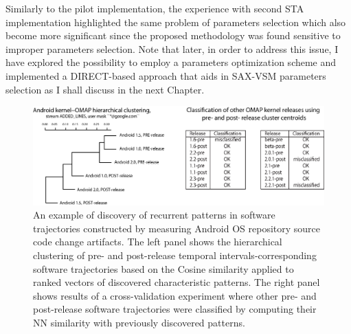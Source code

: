 Similarly to the pilot implementation, the experience with second STA implementation highlighted the same problem of 
parameters selection which also become more significant since the proposed methodology was found sensitive to improper parameters 
selection. Note that later, in order to address this issue, I have explored the possibility to employ a parameters optimization 
scheme and implemented a DIRECT-based approach \cite{citeulike:12563460} that aids in SAX-VSM parameters selection as 
I shall discuss in the next Chapter.

\begin{figure}[t]
   \centering
   \includegraphics[width=145mm]{figures/STA2.eps}
   \caption{An example of discovery of recurrent patterns in software trajectories constructed by measuring Android OS 
   repository source code change artifacts.
   The left panel shows the hierarchical clustering of pre- and post-release temporal intervals-corresponding software 
   trajectories based on the Cosine similarity applied to ranked vectors of discovered characteristic patterns.
   The right panel shows results of a cross-validation experiment where other pre- and post-release software trajectories 
   were classified by computing their NN similarity with previously discovered patterns.}
   \label{fig:STA2-results}
\end{figure}

